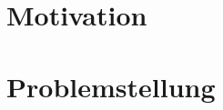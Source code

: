 \section{Motivation}
\lorem
\lorem
\lorem
\lorem

\section{Problemstellung}
\lorem
\lorem

\lorem
\lorem

\lorem
\lorem

\lorem\\[2mm]
\lorem
\lorem
\lorem